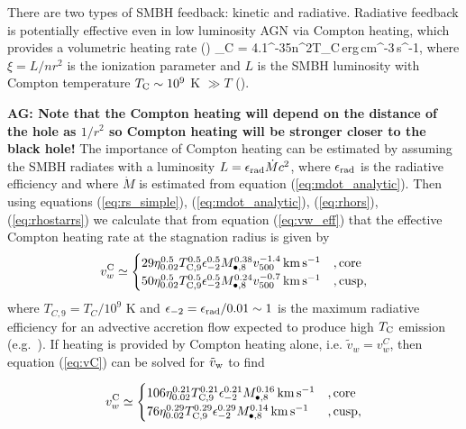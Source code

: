 \documentclass[usenatbib,fleqn]{mn2e}
\begin{document}
There are two types of SMBH feedback: kinetic and radiative.  Radiative feedback is potentially effective even in low luminosity AGN via Compton heating, which provides a volumetric heating rate (\citealt{Gan+14})
\be
{}_{\rm C} = 4.1^{-35}n^{2}\xi T_{\rm C}\,{\rm erg\,cm^{-3}\,s^{-1}},
\ee
where $\xi = L/n r^{2}$ is the ionization parameter and $L$ is the SMBH luminosity with Compton temperature $T_{\rm C} \sim 10^{9}$ K $\gg T$ (\citealt{Gan+14}).  

{\bf AG: Note that the Compton heating will depend on the distance of
  the hole as $1/r^2$ so Compton heating will be stronger closer to the
  black hole! }
The importance of Compton heating can be estimated by assuming the SMBH
radiates with a luminosity $L = \epsilon_{\rm rad} \dot{M}c^{2}$, where
$\epsilon_{\rm rad}$ is the radiative efficiency and where $\dot{M}$ is
estimated from equation (\ref{eq:mdot_analytic}).  Then using
equations (\ref{eq:rs_simple}), (\ref{eq:mdot_analytic}),
(\ref{eq:rhors}), (\ref{eq:rhostarrs}) we calculate that from equation
(\ref{eq:vw_eff}) that the effective Compton heating rate at the stagnation radius is given by
\begin{align} v_{w}^{\rm C} \simeq
  \begin{cases} 29 \eta_{0.02}^{0.5}T_{\rm
C,9}^{0.5}\epsilon_{-2}^{0.5} M_{\bullet,8}^{0.38}v_{500}^{-1.4}\,{\rm
km\,s^{-1}} &, \text{core}\\ 50 \eta_{0.02}^{0.5}T_{\rm
C,9}^{0.5}\epsilon_{-2}^{0.5} M_{\bullet,8}^{0.24}v_{500}^{-0.7}\,{\rm
km\,s^{-1}} &, \text{cusp},
  \end{cases}
  \label{eq:vC}
\end{align} where $T_{C,9} = T_{C}/10^{9}$ K and $\epsilon_{-2} =
\epsilon_{\rm rad}/0.01 \sim 1$ is the maximum radiative efficiency
for an advective accretion flow expected to produce high $T_{\rm C}$
emission (e.g.~\citealt{Narayan&Yi95}).  If heating is provided by
Compton heating alone, i.e. $\tilde{v}_{w} = v_{w}^{C}$, then equation
(\ref{eq:vC}) can be solved for $\tilde{v}_{\rm w}$ to find

\begin{align} v_{w}^{\rm C} \simeq
  \begin{cases} 106 \eta_{0.02}^{0.21}T_{\rm
C,9}^{0.21}\epsilon_{-2}^{0.21} M_{\bullet,8}^{0.16}\,{\rm km\,s^{-1}}
&, \text{core}\\ 76 \eta_{0.02}^{0.29}T_{\rm
C,9}^{0.29}\epsilon_{-2}^{0.29} M_{\bullet,8}^{0.14}\,{\rm km\,s^{-1}}
&, \text{cusp},
  \end{cases}
  \label{eq:vC2}
\end{align} 
\end{document}
